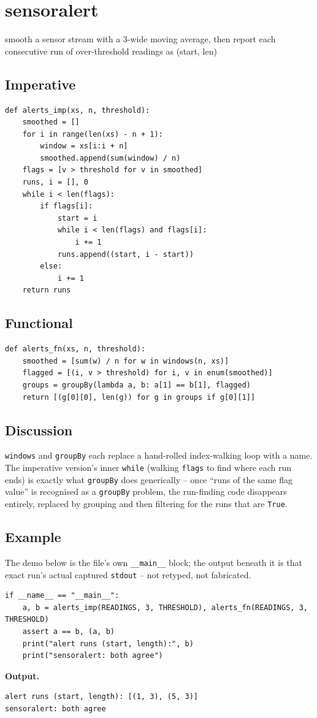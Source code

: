 \documentclass[10pt,letterpaper]{book}
\begin{document}
\chapter{sensoralert}
smooth a sensor stream with a 3-wide moving average, then report each consecutive run of over-threshold readings as (start, len)

\section*{Imperative}
\begin{lstlisting}[style=code]
def alerts_imp(xs, n, threshold):
    smoothed = []
    for i in range(len(xs) - n + 1):
        window = xs[i:i + n]
        smoothed.append(sum(window) / n)
    flags = [v > threshold for v in smoothed]
    runs, i = [], 0
    while i < len(flags):
        if flags[i]:
            start = i
            while i < len(flags) and flags[i]:
                i += 1
            runs.append((start, i - start))
        else:
            i += 1
    return runs
\end{lstlisting}
\section*{Functional}
\begin{lstlisting}[style=code]
def alerts_fn(xs, n, threshold):
    smoothed = [sum(w) / n for w in windows(n, xs)]
    flagged = [(i, v > threshold) for i, v in enum(smoothed)]
    groups = groupBy(lambda a, b: a[1] == b[1], flagged)
    return [(g[0][0], len(g)) for g in groups if g[0][1]]
\end{lstlisting}
\section*{Discussion}

\texttt{windows} and \texttt{groupBy} each replace a hand-rolled
index-walking loop with a name. The imperative version's inner
\texttt{while} (walking \texttt{flags} to find where each run ends) is
exactly what \texttt{groupBy} does generically -- once ``runs of the same
flag value'' is recognised as a \texttt{groupBy} problem, the run-finding
code disappears entirely, replaced by grouping and then filtering for the
runs that are \texttt{True}.

\section*{Example}
The demo below is the file's own \texttt{\_\_main\_\_} block; the output beneath it is that exact run's actual captured \texttt{stdout} -- not retyped, not fabricated.
\begin{lstlisting}[style=code]
if __name__ == "__main__":
    a, b = alerts_imp(READINGS, 3, THRESHOLD), alerts_fn(READINGS, 3, THRESHOLD)
    assert a == b, (a, b)
    print("alert runs (start, length):", b)
    print("sensoralert: both agree")
\end{lstlisting}
\noindent\textbf{Output.}
\begin{lstlisting}[style=ex]
alert runs (start, length): [(1, 3), (5, 3)]
sensoralert: both agree
\end{lstlisting}
\end{document}
